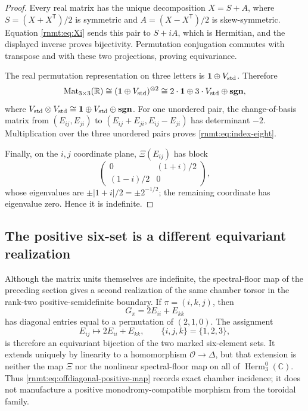 \begin{proof}
Every real matrix has the unique decomposition
\(X=S+A\), where
\(S=(X+X^{\mathsf T})/2\) is symmetric and
\(A=(X-X^{\mathsf T})/2\) is skew-symmetric.  Equation
\eqref{rnmt:eq:Xi} sends this pair to \(S+iA\), which is Hermitian, and the
displayed inverse proves bijectivity.  Permutation conjugation commutes with
transpose and with these two projections, proving equivariance.

The real permutation representation on three letters is
\(\mathbf1\oplus V_{\rm std}\).  Therefore
\[
 \operatorname{Mat}_{3\times3}(\mathbb R)
 \cong(\mathbf1\oplus V_{\rm std})^{\otimes2}
 \cong2\mathbin{\cdot}\mathbf 1\oplus
       3\mathbin{\cdot}V_{\rm std}\oplus\mathbf{sgn},
\]
where
\(V_{\rm std}\otimes V_{\rm std}
 \cong\mathbf1\oplus V_{\rm std}\oplus\mathbf{sgn}\).
For one unordered pair, the change-of-basis matrix from
\((E_{ij},E_{ji})\) to
\((E_{ij}+E_{ji},E_{ij}-E_{ji})\) has determinant \(-2\).  Multiplication
over the three unordered pairs proves \eqref{rnmt:eq:index-eight}.

Finally, on the \(i,j\) coordinate plane, \(\Xi(E_{ij})\) has block
\[
 \begin{pmatrix}0&(1+i)/2\\(1-i)/2&0\end{pmatrix},
\]
whose eigenvalues are \(\pm |1+i|/2=\pm2^{-1/2}\); the remaining coordinate
has eigenvalue zero.  Hence it is indefinite.
\end{proof}

\subsection{The positive six-set is a different equivariant realization}

Although the matrix units themselves are indefinite, the spectral-floor map
of the preceding section gives a second realization of the same chamber
torsor in the rank-two positive-semidefinite boundary.  If
\(\pi=(i,k,j)\), then
\begin{equation}
 G_\pi=2E_{ii}+E_{kk}
 \label{rnmt:eq:positive-six-set}
\end{equation}
has diagonal entries equal to a permutation of \((2,1,0)\).  The assignment
\begin{equation}
 E_{ij}\longmapsto 2E_{ii}+E_{kk},
 \qquad \{i,j,k\}=\{1,2,3\},
 \label{rnmt:eq:offdiagonal-positive-map}
\end{equation}
is therefore an equivariant bijection of the two marked six-element sets.
It extends uniquely by linearity to a homomorphism
\(\mathcal O\to\Delta\), but that extension is neither the map \(\Xi\) nor
the nonlinear spectral-floor map on all of
\(\operatorname{Herm}_3^0(\mathbb C)\).  Thus
\eqref{rnmt:eq:offdiagonal-positive-map} records exact chamber incidence; it
does not manufacture a positive monodromy-compatible morphism from the
toroidal family.

